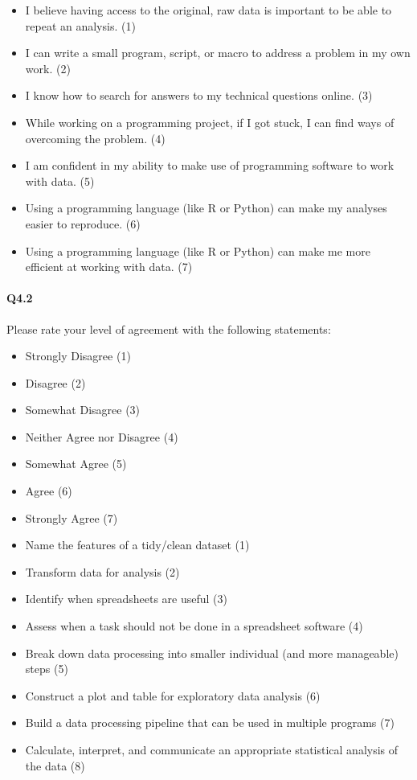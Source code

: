 \documentclass[030-workshop.tex]{subfiles}
\begin{document}
        \begin{itemize}
            \item I believe having access to the original, raw data is important to be able to repeat an analysis. (1)
            \item I can write a small program, script, or macro to address a problem in my own work. (2)
            \item I know how to search for answers to my technical questions online. (3)
            \item While working on a programming project, if I got stuck, I can find ways of overcoming the problem. (4)
            \item I am confident in my ability to make use of programming software to work with data. (5)
            \item Using a programming language (like R or Python) can make my analyses easier to reproduce. (6)
            \item Using a programming language (like R or Python) can make me more efficient at working with data. (7)
        \end{itemize}

    \paragraph{Q4.2}

        Please rate your level of agreement with the following statements:

        \begin{itemize}
            \item Strongly Disagree (1)
            \item Disagree (2)
            \item Somewhat Disagree (3)
            \item Neither Agree nor Disagree (4)
            \item Somewhat Agree (5)
            \item Agree (6)
            \item Strongly Agree (7)
        \end{itemize}

        \begin{itemize}
            \item Name the features of a tidy/clean dataset (1)
            \item Transform data for analysis (2)
            \item Identify when spreadsheets are useful (3)
            \item Assess when a task should not be done in a spreadsheet software (4)
            \item Break down data processing into smaller individual (and more manageable) steps (5)
            \item Construct a plot and table for exploratory data analysis (6)
            \item Build a data processing pipeline that can be used in multiple programs (7)
            \item Calculate, interpret, and communicate an appropriate statistical analysis of the data (8)
        \end{itemize}
\end{document}
